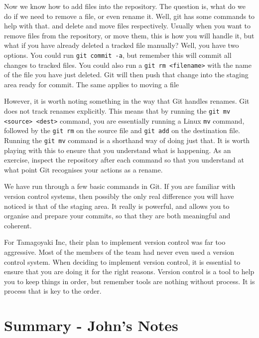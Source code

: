Now we know how to add files into the repository.
The question is, what do we do if we need to remove a file, or even rename it.
Well, git has some commands to help with that.
 and  delete and move files respectively.
Usually when you want to remove files from the repository, or move them, this is how you will handle it, but what if you have already deleted a tracked file manually? Well, you have two options.
You could run \texttt{git commit -a}, but remember this will commit all changes to tracked files.
You could also run a \texttt{git rm <filename>} with the name of the file you have just deleted.
Git will then push that change into the staging area ready for commit.
The same applies to moving a file

However, it is worth noting something in the way that Git handles renames.
Git does not track renames explicitly.
This means that by running the \texttt{git mv <source> <dest>} command, you are essentially running a Linux \texttt{mv} command, followed by the \texttt{git rm} on the source file and \texttt{git add} on the destination file.
Running the \texttt{git mv} command is a shorthand way of doing just that.
It is worth playing with this to ensure that you understand what is happening.
As an exercise, inspect the repository after each command so that you understand at what point Git recognises your actions as a rename.

We have run through a few basic commands in Git.
If you are familiar with version control systems, then possibly the only real difference you will have noticed is that of the staging area.
It really is powerful, and allows you to organise and prepare your commits, so that they are both meaningful and coherent.

For Tamagoyaki Inc, their plan to implement version control was far too aggressive.
Most of the members of the team had never even used a version control system.
When deciding to implement version control, it is essential to ensure that you are doing it for the right reasons.
Version control is a tool to help you to keep things in order, but remember tools are nothing without process.
It is process that is key to the order.


\clearpage
\section{Summary - John's Notes}
